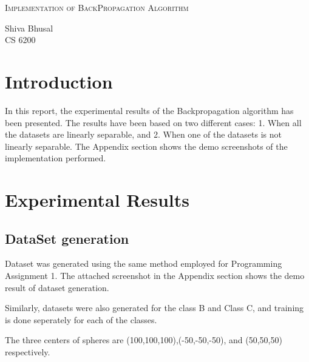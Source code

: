 \documentclass[letterpaper]{article}
\newcommand{\reporttitle}{Implementation of BackPropagation Algorithm}
\newcommand{\name}{Shiva Bhusal}
\newcommand{\course}{CS 6200}
\begin{document}
\begin{center}{\huge \scshape \reporttitle}\end{center}
\begin{center}\vspace{0.2em} {\Large \name\\}
  {\course}\end{center}
  
  
  \section{Introduction}
  In this report, the experimental results of the Backpropagation algorithm has been presented. The results have been based on two different cases: 1. When all the datasets are linearly separable, and 2. When one of the datasets is not linearly separable. The Appendix section shows the demo screenshots of the implementation performed. 

  \section {Experimental Results}
  \subsection {DataSet generation}
  Dataset was generated using the same method employed for Programming Assignment 1. 
  The attached screenshot in the Appendix section shows the demo result of dataset generation. 
  
  Similarly, datasets were also generated for the class B and Class C, and training is done seperately for each of the classes. 

  The three centers of spheres are (100,100,100),(-50,-50,-50), and (50,50,50) respectively. 
\end{document}
